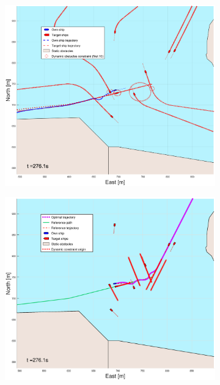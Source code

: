 \begin{figure}[ht]
\begin{subfigure}[b]{0.499\textwidth}
    \end{subfigure}
    \hfill
    \\ 
    \begin{subfigure}[b]{0.49\textwidth}
        \centering
        \includegraphics[width=\textwidth]{Images/Figures/Trheimfjord/_Simple_1fig1_time=276}
    \end{subfigure}
    \hfill
    \begin{subfigure}[b]{0.499\textwidth}
        \centering
        \includegraphics[width=\textwidth]{Images/Figures/Trheimfjord/_Simple_1fig999_time=276}
    \end{subfigure}
    \hfill
\end{figure}
